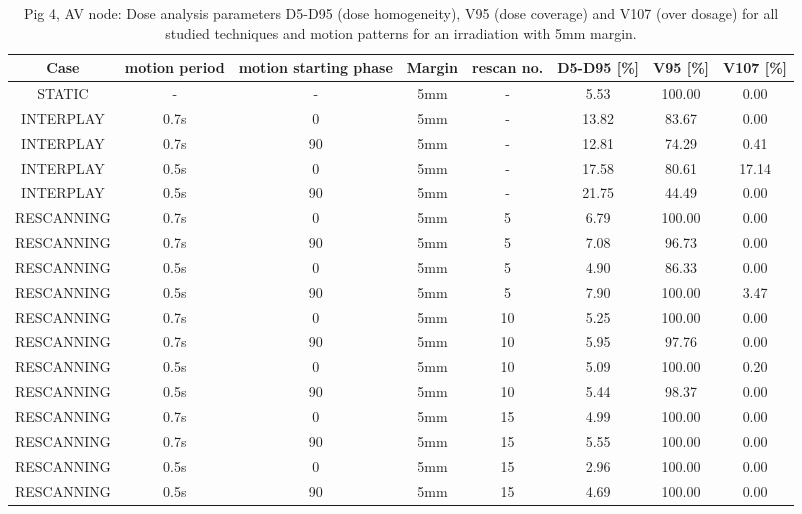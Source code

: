 \documentclass[type=dr, dr=rernat, accentcolor=tud7b,colorbacktitle, bigchapter, openright, twoside, 12pt ]{tudthesis}
\begin{document}
\begin{table}[H]
  \centering
  \tiny
  \caption{Pig 4, AV node: Dose analysis parameters D5-D95 (dose homogeneity), V95 (dose coverage) and V107 (over dosage) for all studied 
  techniques and motion patterns for an irradiation with 5mm margin.}
  \begin{tabular}{|c||c|c|c|c||c|c|c|}
    \hline\hline
    Case & motion period & motion starting phase & Margin & rescan no. & D5-D95 [\%] & V95 [\%] & V107 [\%] \\
    \hline \hline
STATIC & - & - & 5mm & - & 5.53 & 100.00 & 0.00\\
\hline \hline
INTERPLAY & 0.7s & 0 & 5mm & - & 13.82 & 83.67 & 0.00\\
INTERPLAY & 0.7s & 90 & 5mm & - & 12.81 & 74.29 & 0.41\\
INTERPLAY & 0.5s & 0 & 5mm & - & 17.58 & 80.61 & 17.14\\
INTERPLAY & 0.5s & 90 & 5mm & - & 21.75 & 44.49 & 0.00\\
\hline \hline
RESCANNING & 0.7s & 0 & 5mm & 5 & 6.79 & 100.00 & 0.00\\
RESCANNING & 0.7s & 90 & 5mm & 5 & 7.08 & 96.73 & 0.00\\
RESCANNING & 0.5s & 0 & 5mm & 5 & 4.90 & 86.33 & 0.00\\
RESCANNING & 0.5s & 90 & 5mm & 5 & 7.90 & 100.00 & 3.47\\
\hline
RESCANNING & 0.7s & 0 & 5mm & 10 & 5.25 & 100.00 & 0.00\\
RESCANNING & 0.7s & 90 & 5mm & 10 & 5.95 & 97.76 & 0.00\\
RESCANNING & 0.5s & 0 & 5mm & 10 & 5.09 & 100.00 & 0.20\\
RESCANNING & 0.5s & 90 & 5mm & 10 & 5.44 & 98.37 & 0.00\\
\hline
RESCANNING & 0.7s & 0 & 5mm & 15 & 4.99 & 100.00 & 0.00\\
RESCANNING & 0.7s & 90 & 5mm & 15 & 5.55 & 100.00 & 0.00\\
RESCANNING & 0.5s & 0 & 5mm & 15 & 2.96 & 100.00 & 0.00\\
RESCANNING & 0.5s & 90 & 5mm & 15 & 4.69 & 100.00 & 0.00\\
    \hline\hline 
  \end{tabular}
  \label{tab:Pig4_AV}
\end{table}
\end{document}

